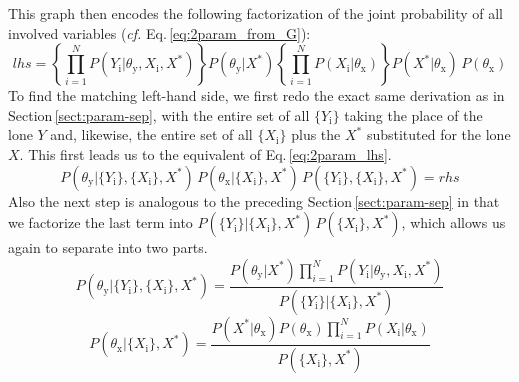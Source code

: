 \documentclass[]{report}
\begin{document}
This graph then encodes the following factorization of the joint probability of all involved variables (\textit{cf.} Eq.\,\ref{eq:2param_from_G}):
\begin{equation}
lhs 
= 
\left\{
	\prod_{i=1}^{N}
		P( Y_\mathrm{i} | \theta_\mathrm{y}, X_\mathrm{i}, X^* )
\right\}
P( \theta_\mathrm{y} | X^* )
\left\{
	\prod_{i=1}^{N}
		P( X_\mathrm{i} | \theta_\mathrm{x} )
\right\}
P( X^* | \theta_\mathrm{x} ) \,
P( \theta_\mathrm{x} )
\end{equation}
To find the matching left-hand side, we first redo the exact same derivation as in Section\,\ref{sect:param-sep}, with the entire set of all $\{Y_\mathrm{i}\}$ taking the place of the lone $Y$ and, likewise, the entire set of all $\{X_\mathrm{i}\}$ plus the $X^*$ substituted for the lone $X$. This first leads us to the equivalent of Eq.\,\ref{eq:2param_lhs}.
\begin{equation}
P( \theta_\mathrm{y} | \{Y_\mathrm{i}\}, \{X_\mathrm{i}\}, X^* ) \,
P( \theta_\mathrm{x} | \{X_\mathrm{i}\}, X^* ) \,
P( \{Y_\mathrm{i}\}, \{X_\mathrm{i}\}, X^* )
= 
rhs
\end{equation}
Also the next step is analogous to the preceding Section\,\ref{sect:param-sep} in that we factorize the last term into $P( \{ Y_\mathrm{i} \} | \{ X_\mathrm{i} \}, X^* ) \, P( \{ X_\mathrm{i} \}, X^* ) $, which allows us again to separate into two parts.
\begin{equation} \label{eq:2params_obs_Y}
P( \theta_\mathrm{y} | \{Y_\mathrm{i}\}, \{X_\mathrm{i}\}, X^* ) 
=
\frac
	{
		P( \theta_\mathrm{y} | X^* )
		\prod_{i=1}^{N}
			P( Y_\mathrm{i} | \theta_\mathrm{y}, X_\mathrm{i}, X^*)
	}
	{
		P( \{Y_\mathrm{i}\} | \{X_\mathrm{i}\}, X^* )
	} 
\end{equation}
\begin{equation} \label{eq:2params_obs_X}
P( \theta_\mathrm{x} | \{X_\mathrm{i}\}, X^* ) 
=
\frac
	{
		P( X^* | \theta_\mathrm{x} )
		P( \theta_\mathrm{x} )
		\prod_{i=1}^{N}
			P( X_\mathrm{i} | \theta_\mathrm{x} )
	}
	{
		P( \{X_\mathrm{i}\}, X^* )
	} 
\end{equation}
\end{document}
